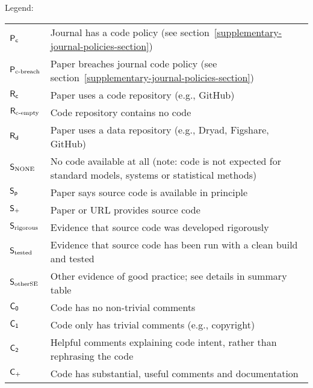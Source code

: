 \documentclass{article}
\begin{document}

\def\flagStyle#1{\textcolor{red}{\sf #1}}

Legend:\\
\begin{tabular}{lp{4.5in}}
\flagStyle{$\sf P_c$}&Journal has a code policy (see section~\ref{supplementary-journal-policies-section})\\
\flagStyle{$\sf P_{{\mbox{\scriptsize c-breach}}}$}&Paper breaches journal code policy (see section~\ref{supplementary-journal-policies-section})\\
\flagStyle{$\sf R_c$}&Paper uses a code repository (e.g., GitHub)\\
\flagStyle{$\sf R_{\mbox{\scriptsize c-empty}}$}&Code repository contains no code\\
\flagStyle{$\sf R_d$}&Paper uses a data repository (e.g., Dryad, Figshare, GitHub)\\
\flagStyle{$\sf S_{\mbox{\scriptsize NONE}}$}&No code available at all (note: code is not expected for standard models, systems or statistical methods)\\
\flagStyle{$\sf S_p$}&Paper says source code is available in principle\\
\flagStyle{$\sf S_{+}$}&Paper or URL provides source code\\
\flagStyle{$\sf S_{{\mbox{\scriptsize rigorous}}}$}&Evidence that source code was developed rigorously\\
\flagStyle{$\sf S_{\mbox{\scriptsize tested}}$}&Evidence that source code has been run with a clean build and tested\\
\flagStyle{$\sf S_{{\mbox{\scriptsize otherSE}}}$}&Other evidence of good practice; see details in summary table\\
\flagStyle{$\sf C_0$}&Code has no non-trivial comments\\
\flagStyle{$\sf C_1$}&Code only has trivial comments (e.g., copyright)\\
\flagStyle{$\sf C_2$}&Helpful comments explaining code intent, rather than rephrasing the code\\
\flagStyle{$\sf C_{+}$}&Code has substantial, useful comments and documentation\\
\end{tabular}

\newpage
\end{document}

